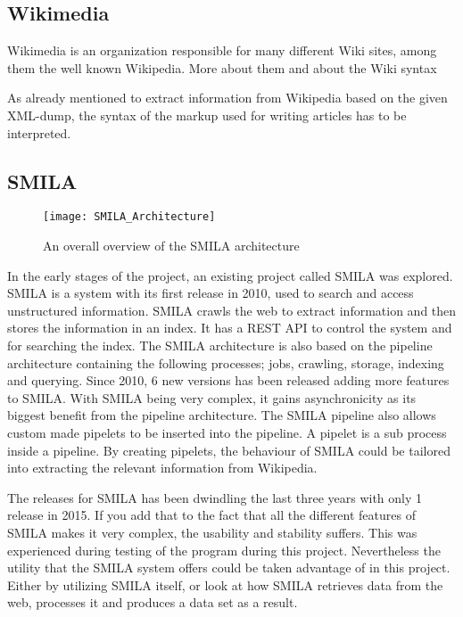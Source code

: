 \subsection{Wikimedia} \label{wikimedia}
Wikimedia is an organization responsible for many different Wiki sites, among them the well known Wikipedia. More about them and about the Wiki syntax

As already mentioned to extract information from Wikipedia based on the given XML-dump, the syntax of the markup used for writing articles has to be interpreted. 

\subsection{SMILA} \label{smila}

\begin{figure}[h]
\caption{An overall overview of the SMILA architecture}
\texttt{[image: SMILA\_Architecture]}
\end{figure}



In the early stages of the project, an existing project called SMILA was explored. SMILA is a system with its first release in 2010, used to search and access unstructured information. SMILA crawls the web to extract information and then stores the information in an index. It has a REST API to control the system and for searching the index. The SMILA architecture is also based on the pipeline architecture containing the following processes; jobs, crawling, storage, indexing and querying. Since 2010, 6 new versions has been released adding more features to SMILA. With SMILA being very complex, it gains asynchronicity as its biggest benefit from the pipeline architecture. The SMILA pipeline also allows custom made pipelets to be inserted into the pipeline. A pipelet is a sub process inside a pipeline. By creating pipelets, the behaviour of SMILA could be tailored into extracting the relevant information from Wikipedia.

The releases for SMILA has been dwindling the last three years with only 1 release in 2015. If you add that to the fact that all the different features of SMILA makes it very complex, the usability and stability suffers. This was experienced during testing of the program during this project.
Nevertheless the utility that the SMILA system offers could be taken advantage of in this project. Either by utilizing SMILA itself, or look at how SMILA retrieves data from the web, processes it and produces a data set as a result.


